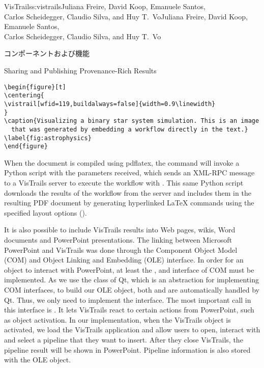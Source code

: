 \begin{aosachaptertoc}{VisTrails}{s:vistrails}{Juliana Freire, David Koop, Emanuele Santos, \\ Carlos Scheidegger, Claudio Silva, and Huy T.\ Vo}{Juliana Freire, David Koop, Emanuele Santos, \\ \hspace*{0.9cm} Carlos Scheidegger, Claudio Silva, and Huy T.\ Vo}
\begin{aosasect1}{コンポーネントおよび機能}
\begin{aosasect2}{Sharing and Publishing Provenance-Rich Results}
\begin{verbatim}
\begin{figure}[t]
\centering{
\vistrail[wfid=119,buildalways=false]{width=0.9\linewidth}
}
\caption{Visualizing a binary star system simulation. This is an image
  that was generated by embedding a workflow directly in the text.}
\label{fig:astrophysics}
\end{figure}
\end{verbatim}

When the document is compiled using pdflatex, the
 command will invoke a Python script
with the parameters received, which sends an XML-RPC message to a
VisTrails server to execute the workflow with . This same
Python script downloads the results of the workflow from the server
and includes them in the resulting PDF document by generating
hyperlinked LaTeX  commands
using the specified layout options
().

It is also possible to include VisTrails results into Web pages,
wikis, Word documents and PowerPoint presentations. The linking
between Microsoft PowerPoint and VisTrails was done through the
Component Object Model (COM) and Object Linking and Embedding (OLE)
interface. In order for an object to interact with PowerPoint, at
least the ,  and
 interface of COM must be implemented. As we use
the  class of Qt, which is an abstraction for
implementing COM interfaces, to build our OLE object, both
 and  are automatically
handled by Qt. Thus, we only need to implement the 
interface. The most important call in this interface is
. It lets VisTrails react to certain actions from
PowerPoint, such as object activation. In our implementation, when the
VisTrails object is activated, we load the VisTrails application and
allow users to open, interact with and select a pipeline that they
want to insert. After they close VisTrails, the pipeline result will
be shown in PowerPoint. Pipeline information is also stored with the
OLE object.


\end{aosasect2}
\end{aosasect1}
\end{aosachaptertoc}
